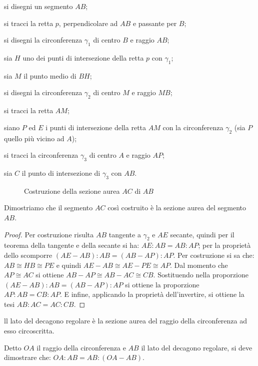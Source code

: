 \begin{enumerate*}
\item si disegni un segmento $AB$;
\item si tracci la retta $p$, perpendicolare ad $AB$ e passante per $B$;
\item si disegni la circonferenza $\gamma_1$ di centro $B$ e raggio $AB$;
\item sia $H$ uno dei punti di intersezione della retta $p$ con $\gamma_1$;
\item sia $M$ il punto medio di $BH$;
\item si disegni la circonferenza $\gamma_2$ di centro $M$ e raggio $MB$;
\item si tracci la retta $AM$;
\item siano $P$ ed $E$ i punti di intersezione della retta $AM$ con la circonferenza $\gamma_2$ (sia $P$ quello più vicino ad $A$);
\item si tracci la circonferenza $\gamma_3$ di centro $A$ e raggio $AP$;
\item sia $C$ il punto di intersezione di $\gamma_3$ con $AB$.
\end{enumerate*}

\begin{figure}[!htb]
	\centering
	\caption{Costruzione della sezione aurea $AC$ di $AB$}\label{fig:sez_aurea2}
\end{figure}

Dimostriamo che il segmento $AC$ così costruito è la sezione aurea del segmento $AB$.
\begin{proof}
Per costruzione risulta $AB$ tangente a $\gamma_2$ e $AE$ secante, quindi per il teorema della tangente e della secante si ha: $AE : AB = AB : AP$; per la proprietà dello scomporre $(AE-AB):AB=(AB-AP):AP$.
Per costruzione si sa che: $AB\cong HB\cong PE$ e quindi $AE - AB \cong AE - PE\cong AP$.
Dal momento che $AP\cong AC$ si ottiene $AB - AP \cong AB - AC \cong CB$.
Sostituendo nella proporzione $(AE-AB):AB=(AB-AP):AP$ si ottiene la proporzione $AP : AB = CB : AP$.
E infine, applicando la proprietà dell'invertire, si ottiene la tesi $AB : AC = AC : CB$.
\end{proof}

\begin{teorema}
ll lato del decagono regolare è la sezione aurea del raggio della circonferenza ad esso circoscritta.
\end{teorema}

Detto $OA$ il raggio della circonferenza e $AB$ il lato del decagono regolare, si deve dimostrare che: $OA:AB=AB:(OA-AB)$.

